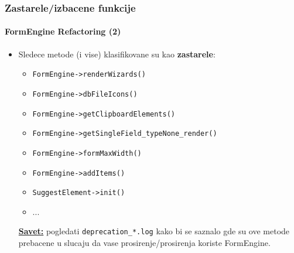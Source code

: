 
\begin{frame}[fragile]
	\frametitle{Zastarele/izbacene funkcije}
	\framesubtitle{FormEngine Refactoring (2)}

	\begin{itemize}

		\item Sledece metode (i vise) klasifikovane su kao \textbf{zastarele}:

			\begin{itemize}
				\item \texttt{FormEngine->renderWizards()}
				\item \texttt{FormEngine->dbFileIcons()}
				\item \texttt{FormEngine->getClipboardElements()}
				\item \texttt{FormEngine->getSingleField\_typeNone\_render()}
				\item \texttt{FormEngine->formMaxWidth()}
				\item \texttt{FormEngine->addItems()}
				\item \texttt{SuggestElement->init()}
				\item ...
			\end{itemize}

		\small
			\underline{\textbf{Savet:}}
			pogledati \texttt{deprecation\_*.log} kako bi se saznalo gde su ove metode
			prebacene u slucaju da vase prosirenje/prosirenja koriste FormEngine.
		\normalsize

	\end{itemize}

\end{frame}


